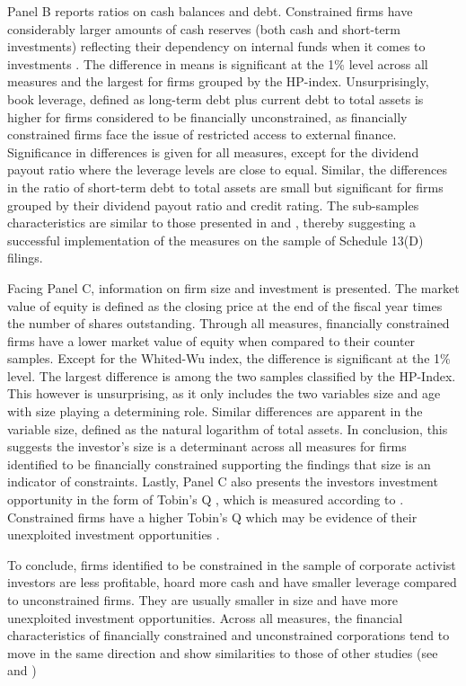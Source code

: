 \documentclass[12pt]{article}
\begin{document}
Panel B reports ratios on cash balances and debt. Constrained firms have considerably larger amounts of cash reserves (both cash and short-term investments) reflecting their dependency on internal funds when it comes to investments \citep[p.142]{Fazzari1988}. The difference in means is significant at the 1\% level across all measures and the largest for firms grouped by the HP-index. Unsurprisingly, book leverage, defined as long-term debt plus current debt to total assets \citep[p.1440]{MacKay2005} is higher for firms considered to be financially unconstrained, as financially constrained firms face the issue of restricted access to external finance. Significance in differences is given for all measures, except for the dividend payout ratio where the leverage levels are close to equal. Similar, the differences in the ratio of short-term debt to total assets are small but significant for firms grouped by their dividend payout ratio and credit rating. The sub-samples characteristics are similar to those presented in \citet[p.544]{Whited2006} and \citet[p.1917]{hadlock2010}, thereby suggesting a successful implementation of the measures on the sample of Schedule 13(D) filings.

Facing Panel C, information on firm size and investment is presented. The market value of equity is defined as the closing price at the end of the fiscal year times the number of shares outstanding. Through all measures, financially constrained firms have a lower market value of equity when compared to their counter samples. Except for the Whited-Wu index, the difference is significant at the 1\% level. The largest difference is among the two samples classified by the HP-Index. This however is unsurprising, as it only includes the two variables size and age with size playing a determining role. Similar differences are apparent in the variable size, defined as the natural logarithm of total assets. In conclusion, this suggests the investor's size is a determinant across all measures for firms identified to be financially constrained supporting the findings that size is an indicator of constraints. Lastly, Panel C also presents the investors investment opportunity in the form of Tobin's Q \citep[p.1441]{MacKay2005}, which is measured according to \citet[p.1]{Khatami2014}. Constrained firms have a higher Tobin's Q which may be evidence of their unexploited investment opportunities \citep[p.539]{Whited2006}.

To conclude, firms identified to be constrained in the sample of corporate activist investors are less profitable, hoard more cash and have smaller leverage compared to unconstrained firms. They are usually smaller in size and have more unexploited investment opportunities. Across all measures, the financial characteristics of financially constrained and unconstrained corporations tend to move in the same direction and show similarities to those of other studies (see \citet[p.544]{Whited2006} and \citet[p.1917]{hadlock2010})
\end{document}
